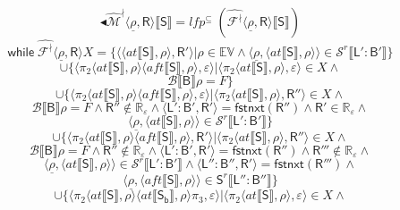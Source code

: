 $$\blacktriangleleft\mathcal{\hat{M}^\nmid} \langle \underline{\rho}, \mathsf{R} \rangle \llbracket \mathsf{S} \rrbracket = lfp^\subseteq \; (\mathcal{\hat{F^\nmid}} \langle \underline{\rho}, \mathsf{R} \rangle \llbracket \mathsf{S} \rrbracket)$$
$$\mathsf{while} \;  \mathcal{\hat{F^\nmid}} \langle \underline{\rho}, \mathsf{R} \rangle X = \{ \langle \langle at \llbracket \mathsf{S} \rrbracket , \rho \rangle , \mathsf{R'} \rangle | \rho \in \mathbb{EV} \land \langle \underline{\rho}, \langle at \llbracket \mathsf{S} \rrbracket , \rho \rangle \rangle \in \mathcal{S}^r \llbracket \mathsf{L':B'} \rrbracket \}$$
$$\cup \{\langle \pi_2 \langle at \llbracket \mathsf{S} \rrbracket , \rho \rangle \langle aft \llbracket \mathsf{S}\rrbracket , \rho \rangle , \varepsilon \rangle | \langle \pi_2 \langle at \llbracket \mathsf{S} \rrbracket , \rho \rangle , \varepsilon \rangle \in X \land$$
$$\mathcal{B}\llbracket \mathsf{B} \rrbracket \rho = \mathit{F} \}$$
$$\cup \{ \langle \pi_2 \langle at \llbracket \mathsf{S} \rrbracket , \rho \rangle \langle aft \llbracket \mathsf{S} \rrbracket , \rho \rangle , \varepsilon \rangle | \langle \pi_2 \langle at \llbracket \mathsf{S} \rrbracket , \rho \rangle , \mathsf{R''} \rangle \in X \land $$
$$\mathcal{B}\llbracket \mathsf{B} \rrbracket \rho = \mathit{F} \land \mathsf{R''} \notin \mathbb{R_\varepsilon} \land \langle \mathsf{L':B',R'} \rangle = \mathsf{fstnxt(R'')} \land \mathsf{R'} \in \mathbb{R_\varepsilon} \land$$
$$\langle \underline{\rho} ,\langle at \llbracket \mathsf{S} \rrbracket , \rho \rangle \rangle \in \mathcal{S}^r \llbracket \mathsf{L':B'} \rrbracket\}$$
$$\cup \{\langle \pi_2 \langle at \llbracket \mathsf{S} \rrbracket , \rho \rangle \langle aft \llbracket \mathsf{S}\rrbracket , \rho \rangle , \mathsf{R'} \rangle | \langle \pi_2 \langle at \llbracket \mathsf{S} \rrbracket , \rho \rangle , \mathsf{R''} \rangle \in X \land$$
$$\mathcal{B}\llbracket \mathsf{B} \rrbracket \rho = \mathit{F} \land \mathsf{R''} \notin \mathbb{R_\varepsilon} \land \langle \mathsf{L':B',R'} \rangle = \mathsf{fstnxt(R'')} \land \mathsf{R'''} \notin \mathbb{R_\varepsilon} \land$$
$$\langle \underline{\rho}, \langle at \llbracket \mathsf{S} \rrbracket , \rho \rangle \rangle \in \mathcal{S}^r \llbracket \mathsf{L':B'} \rrbracket \land \langle \mathsf{L'':B'' , R'} \rangle = \mathsf{fstnxt(R''')} \land$$
$$\langle \underline{\rho}, \langle aft \llbracket \mathsf{S} \rrbracket , \rho \rangle \rangle \in \mathsf{S}^r \llbracket \mathsf{L'':B''} \rrbracket \}$$
$$\cup \{\langle \pi_2 \langle at \llbracket \mathsf{S} \rrbracket , \rho \rangle \langle at \llbracket \mathsf{S_b} \rrbracket , \rho \rangle \pi_3, \varepsilon \rangle | \langle \pi_2 \langle at \llbracket \mathsf{S} \rrbracket , \rho \rangle , \varepsilon \rangle \in X \land$$
